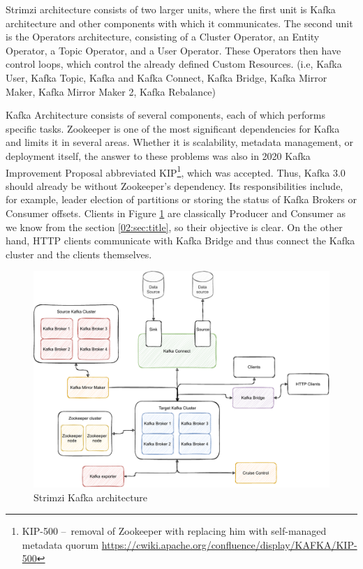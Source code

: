Strimzi architecture consists of two larger units, where the first unit is Kafka architecture and other components with which it communicates. The second unit is the Operators architecture, consisting of a Cluster Operator, an Entity Operator, a Topic Operator, and a User Operator. These Operators then have control loops, which control the already defined Custom Resources. (i.e, Kafka User, Kafka Topic, Kafka and Kafka Connect, Kafka Bridge, Kafka Mirror Maker, Kafka Mirror Maker 2, Kafka Rebalance)

Kafka Architecture consists of several components, each of which performs specific tasks. Zookeeper is one of the most significant dependencies for Kafka and limits it in several areas. Whether it is scalability, metadata management, or deployment itself, the answer to these problems was also in 2020 Kafka Improvement Proposal abbreviated KIP\footnote{KIP-500 \---\ removal of Zookeeper with replacing him with self-managed metadata quorum \url{https://cwiki.apache.org/confluence/display/KAFKA/KIP-500}}, which was accepted. Thus, Kafka 3.0 should already be without Zookeeper's dependency. Its responsibilities include, for example, leader election of partitions or storing the status of Kafka Brokers or Consumer offsets. Clients in Figure \ref{03:fig:strimziKafkaArchitecture} are classically Producer and Consumer as we know from the section \ref{02:sec:title}, so their objective is clear. On the other hand, HTTP clients communicate with Kafka Bridge and thus connect the Kafka cluster and the clients themselves. 
\begin{figure}[!ht]
    \centering
    \includegraphics[scale=0.75]{obrazky-figures/02-preliminaries/03-strimzi/03-strimzi-kafka-architecture (1).pdf}
    \caption{Strimzi Kafka architecture}
    \label{03:fig:strimziKafkaArchitecture}
\end{figure}
